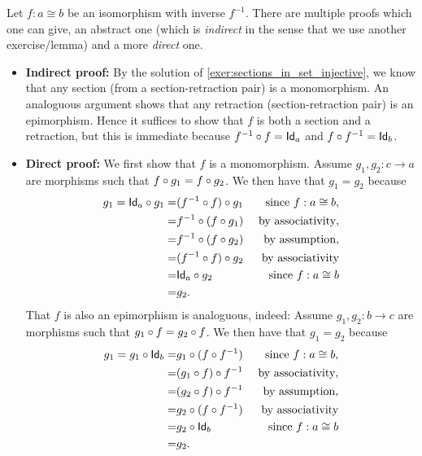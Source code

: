 \begin{solution}\label{sol:iso_to_monoepi}
Let $f : a\cong b$ be an isomorphism with inverse $f^{-1}$. There are multiple proofs which one can give, an abstract one (which is \textit{indirect} in the sense that we use another exercise/lemma) and a more \textit{direct} one.
\begin{itemize}
\item \textbf{Indirect proof:} By the solution of \ref{exer:sections_in_set_injective}, we know that any section (from a section-retraction pair) is a monomorphism. An analoguous argument shows that any retraction (section-retraction pair) is an epimorphism. Hence it suffices to show that $f$ is both a section and a retraction, but this is immediate because $\co{f}{f^{-1}} = \Id[a]$ and $\co{f^{-1}}{f} = \Id[b]$.
\item \textbf{Direct proof:} We first show that $f$ is a monomorphism. Assume $g_1,g_2 : c\to a$ are morphisms such that $\co{g_1}{f} = \co{g_2}{f}$. We then have that $g_1 = g_2$ because 
\begin{eqnarray*}
g_1 = \co{g_1}{\Id[a]} =& \co{g_1}{(\co{f}{f^{-1}})} & \text{ since $f : a\cong b$},\\ 
	=& \co{(\co{g_1}{f})}{f^{-1}} & \text{ by associativity}, \\ 
	=& \co{(\co{g_2}{f})}{f^{-1}} & \text{ by assumption}, \\
	=& \co{g_2}{(\co{f}{f^{-1}})} & \text{ by associativity} \\
	=& \co{g_2}{\Id[a]} & \text{ since $f : a\cong b$} \\
	=& g_2.
\end{eqnarray*}
That $f$ is also an epimorphism is analoguous, indeed: Assume $g_1,g_2 : b\to c$ are morphisms such that $\co{f}{g_1} = \co{f}{g_2}$. We then have that $g_1 = g_2$ because 
\begin{eqnarray*}
g_1 = \co{\Id[b]}{g_1} =& \co{(\co{f^{-1}}{f})}{g_1} & \text{ since $f : a\cong b$},\\ 
	=& \co{f^{-1}}{(\co{f}{g_1})} & \text{ by associativity}, \\ 
	=& \co{f^{-1}}{(\co{f}{g_2})} & \text{ by assumption}, \\
	=& \co{(\co{f^{-1}}{f})}{g_2} & \text{ by associativity} \\
	=& \co{\Id[b]}{g_2} & \text{ since $f : a\cong b$} \\
	=& g_2.
\end{eqnarray*}
\end{itemize}
\end{solution}

